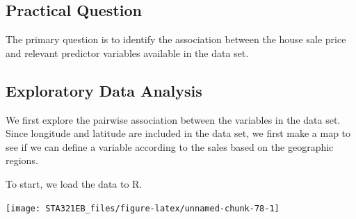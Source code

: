 \documentclass[
]{book}
\newenvironment{Shaded}{\begin{snugshade}}{\end{snugshade}}
\newcommand{\AttributeTok}[1]{\textcolor[rgb]{0.13,0.29,0.53}{#1}}
\newcommand{\CommentTok}[1]{\textcolor[rgb]{0.56,0.35,0.01}{\textit{#1}}}
\newcommand{\ConstantTok}[1]{\textcolor[rgb]{0.56,0.35,0.01}{#1}}
\newcommand{\DecValTok}[1]{\textcolor[rgb]{0.00,0.00,0.81}{#1}}
\newcommand{\FloatTok}[1]{\textcolor[rgb]{0.00,0.00,0.81}{#1}}
\newcommand{\FunctionTok}[1]{\textcolor[rgb]{0.13,0.29,0.53}{\textbf{#1}}}
\newcommand{\NormalTok}[1]{#1}
\newcommand{\OtherTok}[1]{\textcolor[rgb]{0.56,0.35,0.01}{#1}}
\newcommand{\SpecialCharTok}[1]{\textcolor[rgb]{0.81,0.36,0.00}{\textbf{#1}}}
\newcommand{\StringTok}[1]{\textcolor[rgb]{0.31,0.60,0.02}{#1}}
\begin{document}
\hypertarget{practical-question-1}{%
\subsection{Practical Question}\label{practical-question-1}}

The primary question is to identify the association between the house sale price and relevant predictor variables available in the data set.

\hypertarget{exploratory-data-analysis-1}{%
\subsection{Exploratory Data Analysis}\label{exploratory-data-analysis-1}}

We first explore the pairwise association between the variables in the data set. Since longitude and latitude are included in the data set, we first make a map to see if we can define a variable according to the sales based on the geographic regions.

To start, we load the data to R.

\begin{Shaded}
\end{Shaded}

\begin{center}\texttt{[image: STA321EB\_files/figure-latex/unnamed-chunk-78-1]} \end{center}
\end{document}

